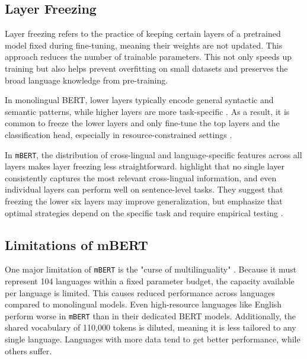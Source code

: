 \subsection{Layer Freezing} \label{subsection:layer_freezing}
    Layer freezing refers to the practice of keeping certain layers of a pretrained model fixed during fine-tuning, meaning their weights are not updated. This approach reduces the number of trainable parameters. This not only speeds up training \parencite{sorrentiSelectiveFreezingEfficient2023} but also helps prevent overfitting on small datasets and preserves the broad language knowledge from pre-training.

    In monolingual BERT, lower layers typically encode general syntactic and semantic patterns, while higher layers are more task-specific \parencite{nadipalliLayerWiseEvolutionRepresentations2025}. As a result, it is common to freeze the lower layers and only fine-tune the top layers and the classification head, especially in resource-constrained settings \parencite{nadipalliLayerWiseEvolutionRepresentations2025}.

    In \texttt{mBERT}, the distribution of cross-lingual and language-specific features across all layers makes layer freezing less straightforward. \textcite{wuBetoBentzBecas2019} highlight that no single layer consistently captures the most relevant cross-lingual information, and even individual layers can perform well on sentence-level tasks. They suggest that freezing the lower six layers may improve generalization, but emphasize that optimal strategies depend on the specific task and require empirical testing \parencite{wuBetoBentzBecas2019}.

\subsection{Limitations of mBERT}
    One major limitation of \texttt{mBERT} is the "curse of multilinguality" \parencite{gurgurovMultilingualLargeLanguage2024}. Because it must represent 104 languages within a fixed parameter budget, the capacity available per language is limited. This causes reduced performance across languages compared to monolingual models. Even high-resource languages like English perform worse in \texttt{mBERT} than in their dedicated BERT models. Additionally, the shared vocabulary of 110,000 tokens is diluted, meaning it is less tailored to any single language. Languages with more data tend to get better performance, while others suffer.

